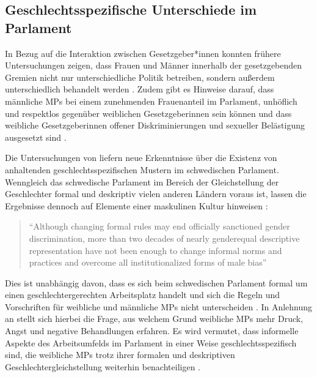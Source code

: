 \documentclass[12pt, 
    twoside=false, 
    bibliography=totoc, 
    numbers=endperiod, 
    headings=normal, 
    toc=chapterentrydotfill
    ]{scrbook}
\begin{document}
\subsection{Geschlechtsspezifische Unterschiede im Parlament}\label{kapitel:geschlechterunterschiede}

In Bezug auf die Interaktion zwischen Gesetzgeber*innen konnten frühere Untersuchungen zeigen, dass Frauen und Männer innerhalb der gesetzgebenden Gremien nicht nur unterschiedliche Politik betreiben, sondern außerdem unterschiedlich behandelt werden \parencites[201]{erikson_2018}{childs_2004}. Zudem gibt es Hinweise darauf, dass männliche MPs bei einem zunehmenden Frauenanteil im Parlament, unhöflich und respektlos gegenüber weiblichen Gesetzgeberinnen sein können \parencites[201]{erikson_2018}{kathlene_1994} und dass weibliche Gesetzgeberinnen offener Diskriminierungen und sexueller Belästigung ausgesetzt sind \parencites[201]{erikson_2018}[76]{lovenduski_2005}{lovenduski_2004}.

Die Untersuchungen von \textcite{erikson_2018} liefern neue Erkenntnisse über die Existenz von anhaltenden geschlechtsspezifischen Mustern im schwedischen Parlament. Wenngleich das schwedische Parlament im Bereich der Gleichstellung der Geschlechter formal und deskriptiv vielen anderen Ländern voraus ist, lassen die Ergebnisse dennoch auf Elemente einer maskulinen Kultur hinweisen \parencite[211]{erikson_2018}:

\citereset
\begin{quote}
    \enquote{Although changing formal rules may end officially sanctioned gender discrimination, more than two decades of nearly genderequal descriptive representation have not been enough to change informal norms and practices and overcome all institutionalized forms of male bias} \parencite[211]{erikson_2018}
\end{quote}

 Dies ist unabhängig davon, dass es sich beim schwedischen Parlament formal um einen geschlechtergerechten Arbeitsplatz handelt und sich die Regeln und Vorschriften für weibliche und männliche MPs nicht unterscheiden \parencite[211]{erikson_2018}. In Anlehnung an \citeauthor{erikson_2018} stellt sich hierbei die Frage, aus welchem Grund weibliche MPs mehr Druck, Angst und negative Behandlungen erfahren. Es wird vermutet, dass informelle Aspekte des Arbeitsumfelds im Parlament in einer Weise geschlechtsspezifisch sind, die weibliche MPs trotz ihrer formalen und deskriptiven Geschlechtergleichstellung weiterhin benachteiligen \parencite[210]{erikson_2018}.
\end{document}
